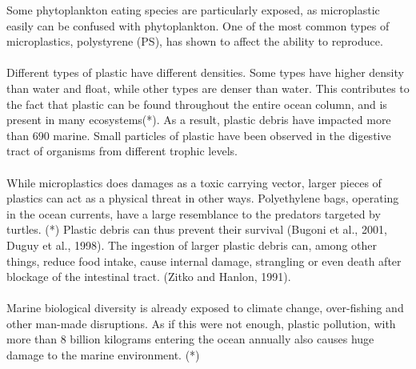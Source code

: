 Some phytoplankton eating species are particularly exposed, as microplastic easily can be confused with phytoplankton. One of the most common types of microplastics, polystyrene (PS), has shown to affect the ability to reproduce. %
\\\\
Different types of plastic have different densities. Some types have higher density than water and float, while other types are denser than water. This contributes to the fact that plastic can be found throughout the entire ocean column, and is present in many ecosystems(*). As a result, plastic debris have impacted more than 690 marine. Small particles of plastic have been observed in the digestive tract of organisms from different trophic levels. 
\\\\
While microplastics does damages as a toxic carrying vector, larger pieces of plastics can act as a physical threat in other ways. Polyethylene bags, operating in the ocean currents, have a large resemblance to the predators targeted by turtles. (*) Plastic debris can thus prevent their survival (Bugoni et al., 2001, Duguy et al., 1998). The ingestion of larger plastic debris can, among other things, reduce food intake, cause internal damage, strangling or even death after blockage of the intestinal tract. (Zitko and Hanlon, 1991).
\\\\
Marine biological diversity is already exposed to climate change, over-fishing and other man-made disruptions. As if this were not enough, plastic pollution, with more than 8 billion kilograms entering the ocean annually
also causes huge damage to the marine environment. (*)

